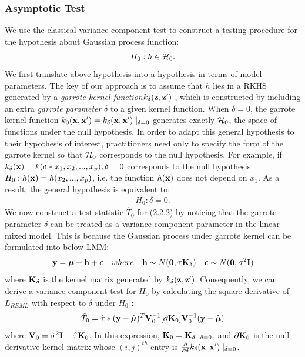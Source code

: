 \documentclass[11pt]{article}
\begin{document}
\subsubsection{{Asymptotic Test}}
We use the classical variance component test \citep{lin_variance_1997} to construct a testing procedure for the hypothesis about Gaussian process function:
\begin{align}
H_0: h \in {\cal H}_0.
\end{align}
We first translate above hypothesis into a hypothesis in terms of model parameters. The key of our approach is to assume that $h$ lies in a RKHS generated by a \textsl{garrote kernel function}$k_{\delta}({\bf z}, {\bf z}')$ \citep{maity_powerful_2011}, which is constructed by including an extra \textsl{garrote parameter} $\delta$ to a given kernel function. When $\delta=0$, the garrote kernel function $k_0({\bf x}, {\bf x}')=k_{\delta}({\bf x}, {\bf x}')\mid _{\delta=0}$ generates exactly ${\cal H}_0$, the space of functions under the null hypothesis. In order to adapt this general hypothesis to their hypothesis of interest, practitioners need only to specify the form of the garrote kernel so that ${\cal H}_0$ corresponds to the null hypothesis. For example, if $k_{\delta}({\bf x})=k(\delta * x_1, x_2,..., x_p), \delta=0$ corresponds to the null hypothesis $H_0: h({\bf x})=h(x_2,...,x_p)$, i.e. the function $h({\bf x})$ does not depend on $x_1$. As a result, the general hypothesis is equivalent to:
\begin{align}
H_0: \delta=0.
\end{align}
We now construct a test statistic $\hat{T}_0$ for (2.2.2) by noticing that the garrote parameter $\delta$ can be treated as a variance component parameter in the linear mixed model. This is because the Gaussian process under garrote kernel can be formulated into below LMM:
\begin{align*}
{\bf y}=\boldsymbol{\mu}+{\bf h}+\boldsymbol{\epsilon} \quad where \quad {\bf h} \sim N(\mathbf{0}, \tau {\bf K}_\delta) \quad \boldsymbol{\epsilon} \sim N(\mathbf{0}, \sigma^2{\bf I})
\end{align*}
where ${\bf K}_\delta$ is the kernel matrix generated by $k_{\delta}({\bf z}, {\bf z}')$. Consequently, we can derive a variance component test for $H_0$ by calculating the square derivative of $L_{REML}$ with respect to $\delta$ under $H_0$ \citep{lin_variance_1997}:
\begin{align}
\hat{T}_0=\hat{\tau}*({\bf y}-\hat{\boldsymbol{\mu}})^T{\bf V}_0^{-1}[\partial {\bf K}_0]{\bf V}_0^{-1}({\bf y}-\hat{\boldsymbol{\mu}})
\end{align}
where ${\bf V}_0=\hat{\sigma}^2{\bf I}+\hat{\tau}{\bf K}_0$. In this expression, ${\bf K}_0={\bf K}_\delta \mid_{\delta=0}$, and $\partial {\bf K}_0$ is the null derivative kernel matrix whose $(i, j)^{th}$ entry is $\frac{\partial }{\partial \delta}k_\delta({\bf x}, {\bf x}') \mid_{\delta=0}$.
\end{document}
